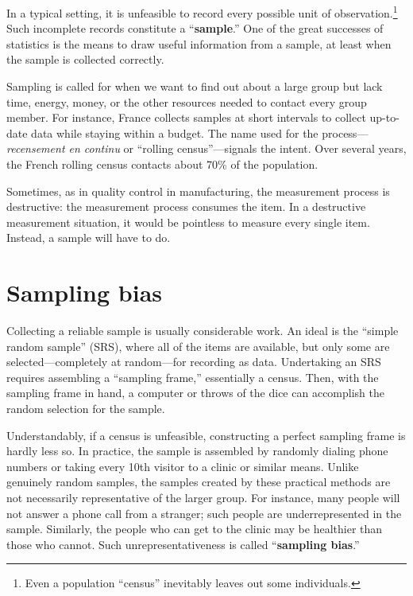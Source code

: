 \documentclass[
  letterpaper,
  DIV=11,
  numbers=noendperiod,
  oneside]{scrreprt}
\begin{document}
In a typical setting, it is unfeasible to record every possible unit of
observation.\footnote{Even a population ``census'' inevitably leaves out
  some individuals.} Such incomplete records constitute a
``\textbf{sample}.'' One of the great successes of statistics is the
means to draw useful information from a sample, at least when the sample
is collected correctly.

Sampling is called for when we want to find out about a large group but
lack time, energy, money, or the other resources needed to contact every
group member. For instance, France collects samples at short intervals
to collect up-to-date data while staying within a budget. The name used
for the process---\emph{recensement en continu} or ``rolling
census''---signals the intent. Over several years, the French rolling
census contacts about 70\% of the population.

Sometimes, as in quality control in manufacturing, the measurement
process is destructive: the measurement process consumes the item. In a
destructive measurement situation, it would be pointless to measure
every single item. Instead, a sample will have to do.

\hypertarget{sampling-bias}{%
\section{Sampling bias}\label{sampling-bias}}

Collecting a reliable sample is usually considerable work. An ideal is
the ``simple random sample'' (SRS), where all of the items are
available, but only some are selected---completely at random---for
recording as data. Undertaking an SRS requires assembling a ``sampling
frame,'' essentially a census. Then, with the sampling frame in hand, a
computer or throws of the dice can accomplish the random selection for
the sample.

Understandably, if a census is unfeasible, constructing a perfect
sampling frame is hardly less so. In practice, the sample is assembled
by randomly dialing phone numbers or taking every 10th visitor to a
clinic or similar means. Unlike genuinely random samples, the samples
created by these practical methods are not necessarily representative of
the larger group. For instance, many people will not answer a phone call
from a stranger; such people are underrepresented in the sample.
Similarly, the people who can get to the clinic may be healthier than
those who cannot. Such unrepresentativeness is called ``\textbf{sampling
bias}.''
\end{document}
